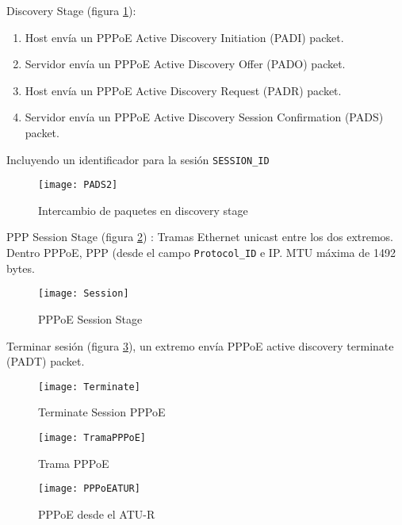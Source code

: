 \documentclass[10pt,portrait, twocolumn]{article}
\begin{document}
Discovery Stage (figura \ref{fig:PADS}):

	\begin{enumerate}
		\item Host envía un PPPoE Active Discovery Initiation (PADI) packet.
		\item Servidor envía un PPPoE Active Discovery Offer (PADO) packet.
		\item Host envía un PPPoE Active Discovery Request (PADR) packet.
		\item Servidor envía un PPPoE Active Discovery Session Confirmation (PADS) packet.
	\end{enumerate}
	
Incluyendo un identificador para la sesión \texttt{SESSION\_ID}



\begin{figure}[h]	
	\centering
    	\texttt{[image: PADS2]}
	\caption{Intercambio de paquetes en discovery stage}
	\label{fig:PADS}
  \end{figure}
  
PPP Session Stage (figura \ref{fig:PPPoESessionStage}) : Tramas Ethernet unicast entre los dos extremos. Dentro PPPoE, PPP (desde el campo \texttt{Protocol\_ID} e IP. MTU máxima de 1492 bytes.
  
\begin{figure}[h]	
	\centering
    	\texttt{[image: Session]}
	\caption{PPPoE Session Stage}
	\label{fig:PPPoESessionStage}
  \end{figure}
  
Terminar sesión (figura \ref{fig:TerminarSesion}), un extremo envía PPPoE active discovery terminate (PADT) packet.  \\

\begin{figure}[h]	
	\centering
    	\texttt{[image: Terminate]}
	\caption{Terminate Session PPPoE}
	\label{fig:TerminarSesion}
  \end{figure}
  
\begin{figure}[!ht]	
	\centering
    	\texttt{[image: TramaPPPoE]}
	\caption{Trama PPPoE}
  \end{figure}
  
  
\begin{figure}[!ht]	
	\centering
    	\texttt{[image: PPPoEATUR]}
	\caption{PPPoE desde el ATU-R}
	\label{fig:PPPoEATUR}
  \end{figure}  
  
\end{document}
